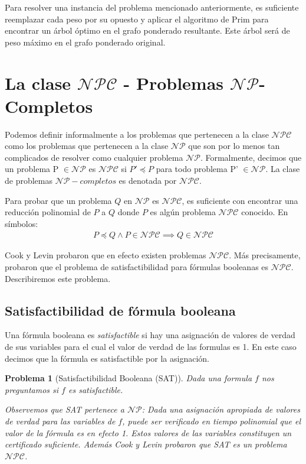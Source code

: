 \documentclass{article}
\newtheorem{problem}{Problema}
\begin{document}
Para resolver una instancia del problema mencionado anteriormente,
es suficiente reemplazar cada peso por su opuesto y aplicar el algoritmo
de Prim para encontrar un árbol óptimo en el grafo ponderado resultante.
Este árbol será de peso máximo en el grafo ponderado original.

\section*{La clase $\mathcal{NPC}$ - Problemas $\mathcal{NP}$-Completos}
Podemos definir informalmente a los problemas que pertenecen a la clase
$\mathcal{NPC}$ como los problemas que pertenecen a la clase $\mathcal{NP}$
que son por lo menos tan complicados de resolver como cualquier problema
$\mathcal{NP}$. Formalmente, decimos que un problema P $\in \mathcal{NP}$
es $\mathcal{NPC}$ si $P' \preceq P$ para todo problema P' $\in \mathcal{NP}$.
La clase de problemas $\mathcal{NP-}completos$ es denotada por $\mathcal{NPC}$.

Para probar que un problema $Q$ en $\mathcal{NP}$ es $\mathcal{NPC}$,
es suficiente con encontrar una reducción polinomial de $P$ a $Q$
donde $P$ es algún problema $\mathcal{NPC}$ conocido. En símbolos:
\begin{align*}
    P \preceq Q \land P \in \mathcal{NPC} \implies Q\in   \mathcal{NPC}
\end{align*}

Cook y Levin probaron que en efecto existen problemas $\mathcal{NPC}$.
Más precisamente, probaron que el problema de satisfactibilidad para
fórmulas booleanas es $\mathcal{NPC}$. Describiremos este problema.

\subsection*{Satisfactibilidad de fórmula booleana}
Una fórmula booleana es \textit{satisfactible} si hay una asignación
de valores de verdad de sus variables para el cual el valor de
verdad de las formulas es 1. En este caso decimos que la fórmula
es satisfactible por la asignación.

\begin{problem}[Satisfactibilidad Booleana (SAT)]
Dada una formula $f$ nos preguntamos si $f$ es satisfactible.

Observemos que SAT pertenece a $\mathcal{NP}$: Dada una asignación
apropiada de valores de verdad para las variables de $f$, puede
ser verificado en tiempo polinomial que el valor de la fórmula
es en efecto 1. Estos valores de las variables constituyen
un certificado suficiente. Además Cook y Levin probaron que
SAT es un problema $\mathcal{NPC}$.
\end{problem}
\end{document}

